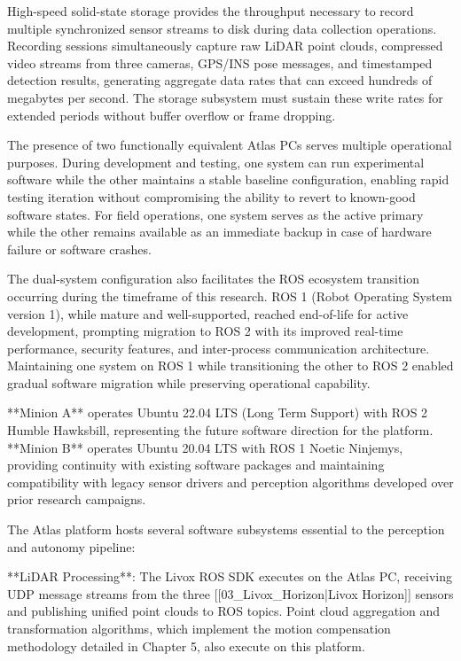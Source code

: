 \documentclass{erauthesis}
\begin{document}
High-speed solid-state storage provides the throughput necessary to record multiple synchronized sensor streams to disk during data collection operations. Recording sessions simultaneously capture raw LiDAR point clouds, compressed video streams from three cameras, GPS/INS pose messages, and timestamped detection results, generating aggregate data rates that can exceed hundreds of megabytes per second. The storage subsystem must sustain these write rates for extended periods without buffer overflow or frame dropping.

The presence of two functionally equivalent Atlas PCs serves multiple operational purposes. During development and testing, one system can run experimental software while the other maintains a stable baseline configuration, enabling rapid testing iteration without compromising the ability to revert to known-good software states. For field operations, one system serves as the active primary while the other remains available as an immediate backup in case of hardware failure or software crashes.

The dual-system configuration also facilitates the ROS ecosystem transition occurring during the timeframe of this research. ROS 1 (Robot Operating System version 1), while mature and well-supported, reached end-of-life for active development, prompting migration to ROS 2 with its improved real-time performance, security features, and inter-process communication architecture. Maintaining one system on ROS 1 while transitioning the other to ROS 2 enabled gradual software migration while preserving operational capability.

**Minion A** operates Ubuntu 22.04 LTS (Long Term Support) with ROS 2 Humble Hawksbill, representing the future software direction for the platform. **Minion B** operates Ubuntu 20.04 LTS with ROS 1 Noetic Ninjemys, providing continuity with existing software packages and maintaining compatibility with legacy sensor drivers and perception algorithms developed over prior research campaigns.

The Atlas platform hosts several software subsystems essential to the perception and autonomy pipeline:

**LiDAR Processing**: The Livox ROS SDK executes on the Atlas PC, receiving UDP message streams from the three [[03_Livox_Horizon|Livox Horizon]] sensors and publishing unified point clouds to ROS topics. Point cloud aggregation and transformation algorithms, which implement the motion compensation methodology detailed in Chapter 5, also execute on this platform.
\end{document}
